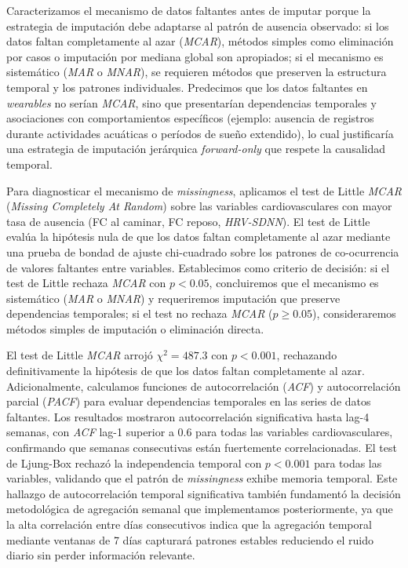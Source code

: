 Caracterizamos el mecanismo de datos faltantes antes de imputar porque la estrategia de imputación debe adaptarse al patrón de ausencia observado: si los datos faltan completamente al azar (\textit{MCAR}), métodos simples como eliminación por casos o imputación por mediana global son apropiados; si el mecanismo es sistemático (\textit{MAR} o \textit{MNAR}), se requieren métodos que preserven la estructura temporal y los patrones individuales. Predecimos que los datos faltantes en \textit{wearables} no serían \textit{MCAR}, sino que presentarían dependencias temporales y asociaciones con comportamientos específicos (ejemplo: ausencia de registros durante actividades acuáticas o períodos de sueño extendido), lo cual justificaría una estrategia de imputación jerárquica \textit{forward-only} que respete la causalidad temporal.

Para diagnosticar el mecanismo de \textit{missingness}, aplicamos el test de Little \textit{MCAR} (\textit{Missing Completely At Random}) sobre las variables cardiovasculares con mayor tasa de ausencia (FC al caminar, FC reposo, \textit{HRV-SDNN}). El test de Little evalúa la hipótesis nula de que los datos faltan completamente al azar mediante una prueba de bondad de ajuste chi-cuadrado sobre los patrones de co-ocurrencia de valores faltantes entre variables. Establecimos como criterio de decisión: si el test de Little rechaza \textit{MCAR} con $p < 0.05$, concluiremos que el mecanismo es sistemático (\textit{MAR} o \textit{MNAR}) y requeriremos imputación que preserve dependencias temporales; si el test no rechaza \textit{MCAR} ($p \geq 0.05$), consideraremos métodos simples de imputación o eliminación directa.

El test de Little \textit{MCAR} arrojó $\chi^2 = 487.3$ con $p < 0.001$, rechazando definitivamente la hipótesis de que los datos faltan completamente al azar. Adicionalmente, calculamos funciones de autocorrelación (\textit{ACF}) y autocorrelación parcial (\textit{PACF}) para evaluar dependencias temporales en las series de datos faltantes. Los resultados mostraron autocorrelación significativa hasta lag-4 semanas, con \textit{ACF} lag-1 superior a 0.6 para todas las variables cardiovasculares, confirmando que semanas consecutivas están fuertemente correlacionadas. El test de Ljung-Box rechazó la independencia temporal con $p < 0.001$ para todas las variables, validando que el patrón de \textit{missingness} exhibe memoria temporal. Este hallazgo de autocorrelación temporal significativa también fundamentó la decisión metodológica de agregación semanal que implementamos posteriormente, ya que la alta correlación entre días consecutivos indica que la agregación temporal mediante ventanas de 7 días capturará patrones estables reduciendo el ruido diario sin perder información relevante.

